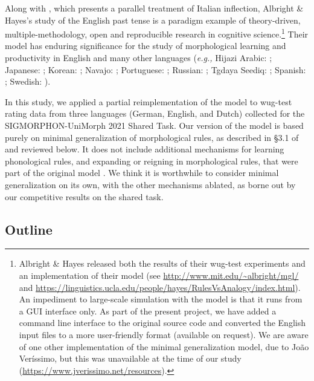 \documentclass[11pt]{article}
\begin{document}
Along with \citet{albright2002}, which presents a parallel treatment of Italian inflection, Albright \& Hayes's study of the English past tense is a paradigm example of theory-driven, multiple-methodology, open and reproducible research in cognitive science.\footnote{Albright \& Hayes released both the results of their wug-test experiments and an implementation of their model (see \url{http://www.mit.edu/~albright/mgl/} and \url{https://linguistics.ucla.edu/people/hayes/RulesVsAnalogy/index.html}). An impediment to large-scale simulation with the model is that it runs from a GUI interface only. As part of the present project, we have added a command line interface to the original source code and converted the English input files to a more user-friendly format (available on request). We are aware of one other implementation of the minimal generalization model, due to Jo\~{a}o Ver\'issimo, but this was unavailable at the time of our study (\url{https://www.jverissimo.net/resources}).} Their model has enduring significance for the study of morphological learning and productivity in English \citep[\emph{e.g.,}][]{racz-etal-2014-rules, racz2020, corkery-etal-2019-yet} and many other languages (\emph{e.g.,} Hijazi Arabic: \citealt{ahyad2019}; Japanese: \citealt{oseki-etal-2019-inverting}; Korean: \citealt{albright2009}; Navajo: \citealt{albright2006}; Portuguese: \citealt{verissimo2014}; Russian: \citealt{kapatsinski2010}; Tgdaya Seediq: \citealt{kuo2020}; Spanish: \citealt{albright2003}; Swedish: \citealt{strik2014}).


In this study, we applied a partial reimplementation of the \citet{albright-hayes-2002-modeling, albright2003} model to wug-test rating data from three languages (German, English, and Dutch) collected for the SIGMORPHON-UniMorph 2021 Shared Task. Our version of the model is based purely on minimal generalization of morphological rules, as described in \S3.1 of \citet{albright-hayes-2002-modeling} and reviewed below. It does not include additional mechanisms for learning phonological rules, and expanding or reigning in morphological rules, that were part of the original model \citep[see][\S3.3 - \S3.7]{albright-hayes-2002-modeling}. We think it is worthwhile to consider minimal generalization on its own, with the other mechanisms ablated, as borne out by our competitive results on the shared task.

\subsection{Outline}
\end{document}
